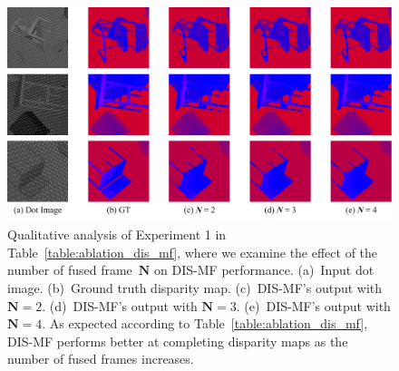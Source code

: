 \begin{figure}[t] 
    \begin{center}
        \includegraphics[width=1.0\linewidth]{images/chapter2/supp_figures/ablation_mf_n.jpg}
    \end{center}
   \caption{Qualitative analysis of Experiment 1 in Table~\ref{table:ablation_dis_mf}, where we examine the effect of the number of fused frame~$\boldsymbol{N}$ on DIS-MF performance. (a)~Input dot image. (b)~Ground truth disparity map. (c)~DIS-MF's output with $\boldsymbol{N} = 2$. (d)~DIS-MF's output with $\boldsymbol{N} = 3$. (e)~DIS-MF's output with $\boldsymbol{N} = 4$. As expected according to Table~\ref{table:ablation_dis_mf}, DIS-MF performs better at completing disparity maps as the number of fused frames increases.} \label{fig:c2_ablation_mf_n}
\end{figure}

